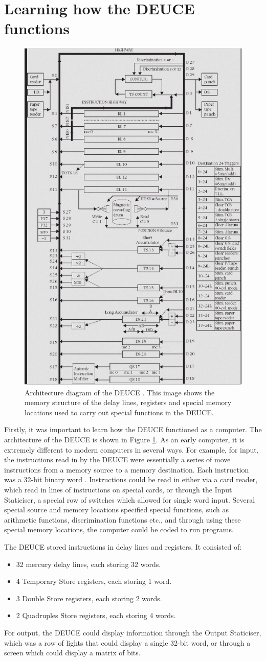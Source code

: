 \documentclass{l4proj}
\begin{document}
\section{Learning how the DEUCE functions}
\begin{figure}[h!]
	\centering
	\includegraphics[width=0.5\linewidth]{images/deuce-arch.jpg} 
	\caption{Architecture diagram of the DEUCE \citep{Vowels05}. This image shows the memory structure of the delay lines, registers and special memory locations used to carry out special functions in the DEUCE.}
	\label{fig:arch}
\end{figure}

Firstly, it was important to learn how the DEUCE functioned as a computer. The architecture of the DEUCE is shown in Figure \ref{fig:arch}. As an early computer, it is extremely different to modern computers in several ways. For example, for input, the instructions read in by the DEUCE were essentially a series of move instructions from a memory source to a memory destination. Each instruction was a 32-bit binary word \citep{Weth10}. Instructions could be read in either via a card reader, which read in lines of instructions on special cards, or through the Input Staticiser, a special row of switches which allowed for single word input. Several special source and memory locations specified special functions, such as arithmetic functions, discrimination functions etc., and through using these special memory locations, the computer could be coded to run programs.


The DEUCE stored instructions in delay lines and registers. It consisted of:
\begin{itemize}
	\item 32 mercury delay lines, each storing 32 words.
	\item 4 Temporary Store registers, each storing 1 word.
	\item 3 Double Store registers, each storing 2 words.
	\item 2 Quadruples Store registers, each storing 4 words.
\end{itemize}	
For output, the DEUCE could display information through the Output Staticiser, which was a row of lights that could display a single 32-bit word, or through a screen which could display a matrix of bits.
\end{document}
